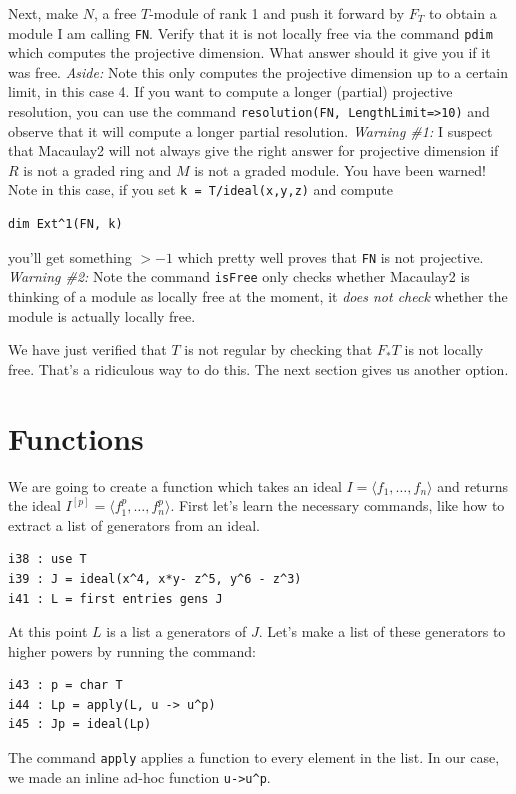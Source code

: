 \documentclass[12pt]{amsart}
\numberwithin{equation}{theorem}
\renewcommand{\:}{\colon}
\begin{document}
\begin{exercise*}
Next, make $N$, a free $T$-module of rank 1 and push it forward by $F_T$ to obtain a module I am calling {\tt FN}.  Verify that it is not locally free via the command {\tt pdim} which computes the projective dimension.  What answer should it give you if it was free.
\emph{Aside:}
Note this only computes the projective dimension up to a certain limit, in this case 4.  If you want to compute a longer (partial) projective resolution, you can use the command {\tt resolution(FN, LengthLimit=>10)} and observe that it will compute a longer partial resolution.
\vskip 3pt
\emph{Warning \#1:} I suspect that Macaulay2 will not always give the right answer for projective dimension if $R$ is not a graded ring and $M$ is not a graded module.  You have been warned!  Note in this case, if you set {\tt k = T/ideal(x,y,z)} and compute
\begin{verbatim}
dim Ext^1(FN, k)
\end{verbatim}
you'll get something $> -1$ which pretty well proves that {\tt FN} is not projective.
\vskip 3pt
\emph{Warning \#2:} Note the command {\tt isFree} only checks whether Macaulay2 is thinking of a module as locally free at the moment, it \emph{does not check} whether the module is actually locally free.
\end{exercise*}

We have just verified that $T$ is not regular by checking that $F_* T$ is not locally free.  That's a ridiculous way to do this.  The next section gives us another option.

\section{Functions}
We are going to create a function which takes an ideal $I = \langle f_1, \ldots, f_n \rangle$ and returns the ideal $I^{[p]} = \langle f_1^p, \ldots, f_n^p \rangle$.  First let's learn the necessary commands, like how to extract a list of generators from an ideal.
\begin{verbatim}
i38 : use T
i39 : J = ideal(x^4, x*y- z^5, y^6 - z^3)
i41 : L = first entries gens J
\end{verbatim}
At this point $L$ is a list a generators of $J$.  Let's make a list of these generators to higher powers by running the command:
\begin{verbatim}
i43 : p = char T
i44 : Lp = apply(L, u -> u^p)
i45 : Jp = ideal(Lp)
\end{verbatim}
The command {\tt apply} applies a function to every element in the list.  In our case, we made an inline ad-hoc function {\tt u->u{\textasciicircum}p}.
\end{document}
